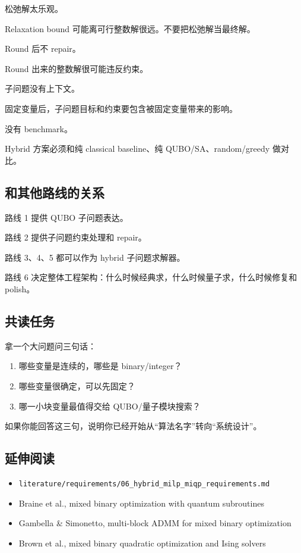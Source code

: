 \documentclass[UTF8,12pt,a4paper]{ctexart}
\begin{document}
松弛解太乐观。

Relaxation bound 可能离可行整数解很远。不要把松弛解当最终解。

Round 后不 repair。

Round 出来的整数解很可能违反约束。

子问题没有上下文。

固定变量后，子问题目标和约束要包含被固定变量带来的影响。

没有 benchmark。

Hybrid 方案必须和纯 classical baseline、纯 QUBO/SA、random/greedy 做对比。

\subsection*{和其他路线的关系}

路线 1 提供 QUBO 子问题表达。

路线 2 提供子问题约束处理和 repair。

路线 3、4、5 都可以作为 hybrid 子问题求解器。

路线 6 决定整体工程架构：什么时候经典求，什么时候量子求，什么时候修复和 polish。

\subsection*{共读任务}

拿一个大问题问三句话：

\begin{enumerate}
\item 哪些变量是连续的，哪些是 binary/integer？
\item 哪些变量很确定，可以先固定？
\item 哪一小块变量最值得交给 QUBO/量子模块搜索？
\end{enumerate}

如果你能回答这三句，说明你已经开始从“算法名字”转向“系统设计”。

\subsection*{延伸阅读}

\begin{itemize}
\item \texttt{literature/requirements/06\_hybrid\_milp\_miqp\_requirements.md}
\item Braine et al., mixed binary optimization with quantum subroutines
\item Gambella \& Simonetto, multi-block ADMM for mixed binary optimization
\item Brown et al., mixed binary quadratic optimization and Ising solvers
\end{itemize}
\end{document}
